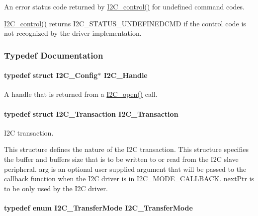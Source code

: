 An error status code returned by \hyperlink{_i2_c_8h_a633003582213a5098467a4e647cc52f9}{I2\+C\+\_\+control()} for undefined command codes. 

\hyperlink{_i2_c_8h_a633003582213a5098467a4e647cc52f9}{I2\+C\+\_\+control()} returns I2\+C\+\_\+\+S\+T\+A\+T\+U\+S\+\_\+\+U\+N\+D\+E\+F\+I\+N\+E\+D\+C\+M\+D if the control code is not recognized by the driver implementation. 

\subsubsection{Typedef Documentation}
\paragraph[{I2\+C\+\_\+\+Handle}]{\setlength{\rightskip}{0pt plus 5cm}typedef struct {\bf I2\+C\+\_\+\+Config}$\ast$ {\bf I2\+C\+\_\+\+Handle}}\label{_i2_c_8h_a5809a229f8395c87f59e63128195c1bf}


A handle that is returned from a \hyperlink{_i2_c_8h_ae1aa99e1fee4517406018e10025cca0e}{I2\+C\+\_\+open()} call. 

\paragraph[{I2\+C\+\_\+\+Transaction}]{\setlength{\rightskip}{0pt plus 5cm}typedef struct {\bf I2\+C\+\_\+\+Transaction}  {\bf I2\+C\+\_\+\+Transaction}}\label{_i2_c_8h_a54d2d506a10628451340a2901bdb6277}


I2\+C transaction. 

This structure defines the nature of the I2\+C transaction. This structure specifies the buffer and buffer\textquotesingle{}s size that is to be written to or read from the I2\+C slave peripheral. arg is an optional user supplied argument that will be passed to the callback function when the I2\+C driver is in I2\+C\+\_\+\+M\+O\+D\+E\+\_\+\+C\+A\+L\+L\+B\+A\+C\+K. next\+Ptr is to be only used by the I2\+C driver. 
\paragraph[{I2\+C\+\_\+\+Transfer\+Mode}]{\setlength{\rightskip}{0pt plus 5cm}typedef enum {\bf I2\+C\+\_\+\+Transfer\+Mode}  {\bf I2\+C\+\_\+\+Transfer\+Mode}}\label{_i2_c_8h_a74176ca6d49d4081eeacb270a8e9c800}



